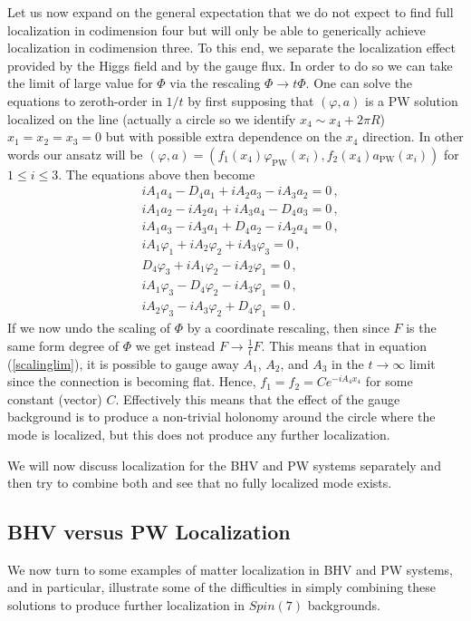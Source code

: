 \documentclass[12pt]{article}%
\numberwithin{equation}{section}
\renewcommand{\(}{\left(}
\renewcommand{\)}{\right)}
\renewcommand{\[}{\left[}
\renewcommand{\]}{\right]}
\begin{document}
Let us now expand on the general expectation that we do not expect to find full localization in codimension four but will only be able to generically achieve localization in codimension three. To this end, we separate the localization effect provided by the Higgs field and by the gauge flux. In order to do so we can take the limit of large value for $\Phi$ via the rescaling $\Phi\rightarrow t\Phi$. One can solve the equations to zeroth-order in $1/t$ by first supposing that $(\varphi,a)$ is a PW solution localized on the line (actually a circle so we identify $x_4\sim x_4+2\pi R$) $x_1=x_2=x_3=0$ but with possible extra dependence on the $x_4$ direction. In other words our ansatz will be $(\varphi,a)=(f_1(x_4)\varphi_{\mathrm{PW}}(x_i), f_2(x_4)a_{\mathrm{PW}}(x_i))$ for $1\leq i \leq 3$. The equations above then become
\begin{align}\label{scalinglim}
&iA_1 a_4-D_4a_1+iA_2 a_3-iA_3 a_2=0\,,\\
&iA_1a_2-iA_2a_1+iA_3a_4-D_4a_3=0\,,\\
&iA_1a_3-iA_3a_1+D_4a_2-iA_2a_4=0\,,\\
&iA_1\varphi_1+iA_2\varphi_2+iA_3\varphi_3=0\,,\\
&D_4\varphi_3+iA_1\varphi_2-iA_2\varphi_1=0\,,\\
&iA_1\varphi_3-D_4\varphi_2-iA_3\varphi_1=0\,,\\
&iA_2\varphi_3-iA_3\varphi_2+D_4\varphi_1=0\,.
\end{align}
If we now undo the scaling of $\Phi$ by a coordinate rescaling, then since $F$ is the same form degree of $\Phi$ we get instead $F\rightarrow \frac{1}{t}F$. This means that in equation (\ref{scalinglim}), it is possible to gauge away $A_1$, $A_2$, and $A_3$ in the $t\rightarrow \infty$ limit since the connection is becoming flat. Hence, $f_1=f_2=Ce^{-iA_4x_4}$ for some constant (vector) $C$. Effectively this means that the effect of the gauge background is to produce a non-trivial holonomy around the circle where the mode is localized, but this does not produce any further localization.

We will now discuss localization for the BHV and PW systems separately and then try to combine both and see that no fully localized mode exists.

\subsection{BHV versus PW Localization}

We now turn to some examples of matter localization in BHV and PW systems, and in particular, illustrate some of the difficulties in simply combining these solutions to produce further localization in $Spin(7)$ backgrounds.
\end{document}
